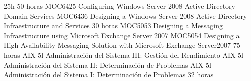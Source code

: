 \documentclass[11pt,a4paper]{moderncv}
\begin{document}
 {25h}{}
 {50 horas}{\scriptsize{
MOC6425 Configuring Windows Server 2008 Active Directory Domain Services \newline %
MOC6436 Designing a Windows Server 2008 Active Directory Infraestructure and Services}}
 {30 horas}{\scriptsize{
MOC5053 Designing a Messaging Infraestructure using Microsoft Exchange Server 2007\newline
MOC5054 Designing a High Availability Messaging Solution with Microsoft Exchange Server2007}}
 {75 horas}{\scriptsize{
AIX 5l Administraci\'on del Sistema III: Gesti\'on del Rendimiento\newline
AIX 5l Administraci\'on del Sistema II: Determinaci\'on de Problemas\newline
AIX 5l Administraci\'on del Sistema I: Determinaci\'on de Problemas}} %
 {32 horas}{}
%
%
\end{document}
